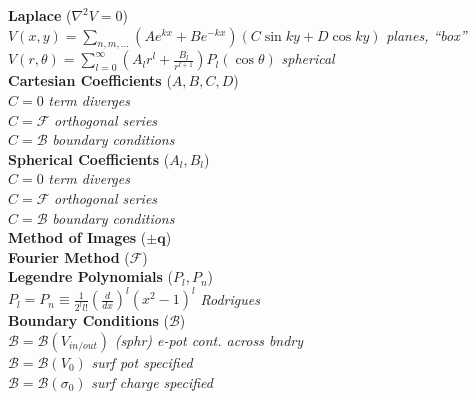 \documentclass{article}
\begin{document}
\begin{multicols}{3}
\textbf{Laplace} ($\nabla^{2}V = 0$) \\
$V(x, y) = \sum_{n,m,\ldots}(Ae^{kx} + Be^{-kx})(C\sin{ky} + D\cos{ky})$  \textit{planes, ``box''} \\
$V(r, \theta) = \sum_{l=0}^{\infty} \left(A_{l}r^{l} + \frac{B_{l}}{r^{l + 1}}\right)P_{l}(\cos{\theta})$ \textit{spherical} \\

\textbf{Cartesian Coefficients} ($A, B, C, D$) \\
$C = 0$  \textit{term diverges} \\
$C = \mathcal{F}$ \textit{orthogonal series} \\
$C = \mathcal{B}$ \textit{boundary conditions} \\

\textbf{Spherical Coefficients} ($A_{l}, B_{l}$) \\
$C = 0$  \textit{term diverges} \\
$C = \mathcal{F}$ \textit{orthogonal series} \\
$C = \mathcal{B}$ \textit{boundary conditions} \\

\textbf{Method of Images} ($\pm\mathbf{q}$) \\

\textbf{Fourier Method} ($\mathcal{F}$) \\

\textbf{Legendre Polynomials} ($P_{l}, P_{n}$) \\
$P_{l} = P_{n} \equiv \frac{1}{2^{l}l!}(\frac{d}{dx})^{l}(x^{2}-1)^{l}$ \textit{Rodrigues} \\


\textbf{Boundary Conditions} ($\mathcal{B}$) \\
$\mathcal{B} = \mathcal{B}(V_{in/out})$ \textit{(sphr) e-pot cont. across bndry} \\
$\mathcal{B} = \mathcal{B}(V_{0})$ \textit{surf pot specified} \\
$\mathcal{B} = \mathcal{B}(\sigma_{0})$ \textit{surf charge specified} \\

\end{multicols}
\end{document}
